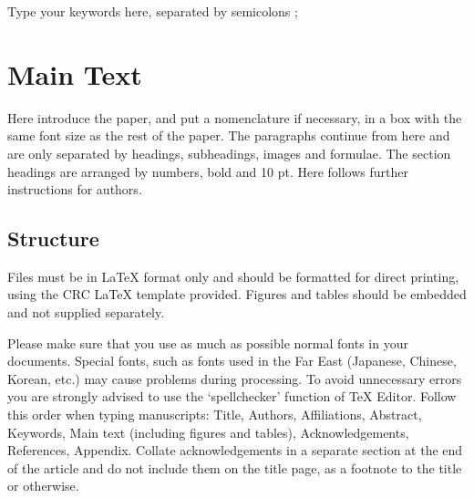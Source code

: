 \documentclass[5p,times,procedia]{elsarticle}
\begin{document}
\begin{frontmatter}
\begin{keyword}
Type your keywords here, separated by semicolons ; 




\end{keyword}

\end{frontmatter}



\section{Main Text}
\label{main}

Here introduce the paper, and put a nomenclature if necessary, in a box with the same font size as the rest of the paper. The paragraphs continue from here and are only separated by headings, subheadings, images and formulae. The section headings are arranged by numbers, bold and 10 pt. Here follows further instructions for authors.

\vspace*{8pt}
\begin{nomenclature}
\begin{deflist}[A]
\end{deflist}
\end{nomenclature}\vskip24pt


\subsection{ Structure}
Files must be in LaTeX format only and should be formatted for direct printing, using the CRC LaTeX template provided. Figures and tables should be embedded and not supplied separately.\vadjust{\vfill\pagebreak}

Please make sure that you use as much as possible normal fonts in your documents. Special fonts, such as fonts used in the Far East (Japanese, Chinese, Korean, etc.) may cause problems during processing. To avoid unnecessary errors you are strongly advised to use the `spellchecker' function of TeX Editor. Follow this order when typing manuscripts: Title, Authors, Affiliations, Abstract, Keywords, Main text (including figures and tables), Acknowledgements, References, Appendix. Collate acknowledgements in a separate section at the end of the article and do not include them on the title page, as a footnote to the title or otherwise.
\end{document}
